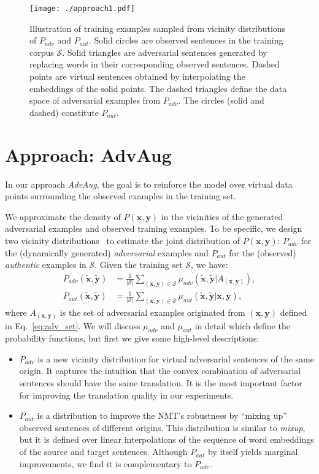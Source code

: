 \documentclass[11pt,a4paper]{article}
\def\S{\mathcal{S}} \def\cS{\vert \mathcal{S} \vert}
\def\bx{\mathbf{x}} \def\bxp{\mathbf{x}^{\prime}} \def\bxpp{\mathbf{x}^{\prime\prime}} \def\tbx{\tilde{\mathbf{x}}} \def\hbx{\hat{\mathbf{x}}} \def\ex{e(\mathbf{x})}
\def\by{\mathbf{y}} \def\byp{\mathbf{y}^{\prime}} \def\bypp{\mathbf{y}^{\prime\prime}} \def\tby{\tilde{\mathbf{y}}} \def\hby{\hat{\mathbf{y}}} \def\ey{e(\mathbf{y})}
\newcommand{\fancyname}{AdvAug}
\newcommand{\mixup}{\textit{mixup}\xspace}
\begin{document}
\begin{figure}[!t]
\centering
\texttt{[image: ./approach1.pdf]} 
\caption{Illustration of training examples sampled from vicinity distributions of $P_{adv}$ and $P_{aut}$. Solid circles are observed sentences in the training corpus $\mathcal{S}$. Solid triangles are adversarial sentences generated by replacing words in their corresponding observed sentences. 
Dashed points are virtual sentences obtained by interpolating the embeddings of the solid points. 
The dashed triangles define the data space of adversarial examples from $P_{adv}$. The circles (solid and dashed) constitute $P_{aut}$.} \label{figure:approach} 
\label{fig:train}
\end{figure}

\section{Approach: \fancyname}
In our approach {\em \fancyname}, the goal is to reinforce the model over virtual data points surrounding the observed examples in the training set.

We approximate the density of $P(\bx, \by)$ in the vicinities of the generated adversarial examples and observed training examples. To be specific, we design two vicinity distributions~\cite{chapelle2001vicinal} to estimate the joint distribution of $P(\bx, \by)$: $P_{adv}$ for the (dynamically generated) \emph{adversarial} examples and $P_{aut}$ for the (observed) \emph{authentic} examples in $\S$. Given the training set $\S$, we have:
\begin{align}
P_{adv}(\tbx, \tby) &=  \frac{1}{\cS} \sum_{ (\bx, \by) \in \S} \mu_{adv} (\tbx, \tby | A_{(\bx, \by)}), \\
P_{aut}(\tbx, \tby) &= \frac{1}{\cS} \sum_{ (\bx, \by) \in \S} \mu_{aut} (\tbx, \tby | \bx, \by),
\end{align}
where $A_{(\bx, \by)}$ is the set of adversarial examples originated from $(\bx, \by)$ defined in Eq.~\eqref{eq:adv_set}. We will discuss $\mu_{adv}$ and $\mu_{aut}$ in detail which define the probability functions, but first we give some high-level descriptions:
\begin{itemize}[leftmargin=*]
    \item $P_{adv}$ is a new vicinity distribution for virtual adversarial sentences of the same origin. It captures the intuition that the convex combination of adversarial sentences should have the same translation. It is the most important factor for improving the translation quality in our experiments.
    \item $P_{aut}$ is a distribution to improve the NMT's robustness by ``mixing up'' observed sentences of different origins. This distribution is similar to \mixup, but it is defined over linear interpolations of the sequence of word embeddings of the source and target sentences. Although $P_{aut}$ by itself yields marginal improvements, we find it is complementary to $P_{adv}$.
\end{itemize}
\end{document}

